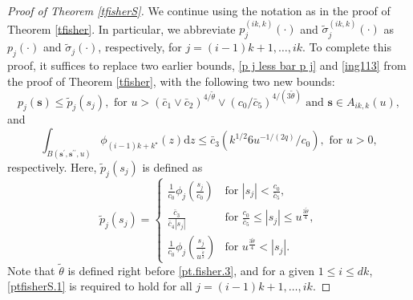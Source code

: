 \documentclass[10pt,a4paper]{amsart}
\begin{document}
\begin{proof}[Proof of Theorem \ref{tfisherS}]
{
We continue using the notation as in the proof of
Theorem \ref{tfisher}.
In particular, we
abbreviate 
$p^{(ik,k)}_j(\cdot)$ and $\tilde{\sigma}^{(ik,k)}_j(\cdot)$ as $p_j(\cdot)$ and $\tilde{\sigma}_j(\cdot)$, respectively,
for
$j=(i-1)k+1,\ldots,ik$.
To complete this proof, it suffices to replace two earlier bounds, \eqref{p j less bar p j}
and \eqref{ing113} from the proof of Theorem \ref{tfisher},
with the following two new bounds:
\begin{equation}\label{ptfisherS.1}
p_j(\mathbf{s})\leq\tilde{p}_j(s_j), \,\,\mbox{for}\,\,u> (\bar{c}_1\vee\bar{c}_2)^{4/\tilde{\theta}} \vee
(c_0/\bar{c}_5)^{4/(3\tilde{\theta})} \,\,\mbox{and}\,\,
 \mathbf{s}\in A_{ik,k}(u),
\end{equation}
and 
\begin{equation}\label{ptfisherS.2}
\int_{B(\mathbf{s}^{\prime},\mathbf{s}^{\prime\prime},u)}\phi_{(i-1)k+k^{\star}}(z)\mathrm{d}z\leq \bar{c}_3(k^{1/2}6u^{-1/(2q)}/c_0),\,\,\mbox{for}\,\, u>0,
\end{equation}
respectively.
Here, $\tilde{p}_j(s_j)$ is defined as
\begin{equation*}
\tilde{p}_j(s_j)= 
  \begin{cases}
    \frac{1}{c_0}\phi_j(\frac{s_j}{c_0}) & \mbox{for } |s_j|<\frac{c_0}{\bar{c}_5}, \\
    \frac{\bar{c}_3}{\bar{c}_4|s_j|} & \mbox{for } \frac{c_0}{\bar{c}_5}\leq|s_j|\leq u^{\frac{3\tilde{\theta}}{4}}, \\
    \frac{1}{c_0}\phi_j(\frac{s_j}{u^{\frac{\tilde{\theta}}{2}}}) & \mbox{for } u^{\frac{3\tilde{\theta}}{4}}<|s_j|.
  \end{cases}
\end{equation*}
Note that
$\tilde{\theta}$ is defined right before \eqref{pt.fisher.3},
and for a given $1\leq i \leq dk$,
\eqref{ptfisherS.1}
is required to hold
for all
$j=(i-1)k+1,\ldots,ik$.

}
\end{proof}
\end{document}
